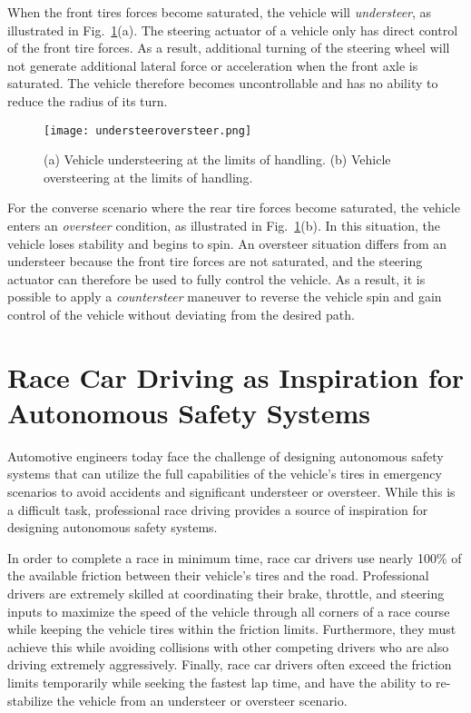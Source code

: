  When the front tires forces become saturated, the vehicle will \textit{understeer}, as illustrated in Fig.~\ref{fig:underover}(a).
 The steering actuator of a vehicle only has direct control of the front tire forces. As a result, 
 additional turning of the steering wheel will not generate additional lateral force or acceleration when the front axle is saturated.
The vehicle therefore becomes uncontrollable and has no ability to reduce the radius of its turn. 
  \begin{figure}[h]
\centering
\texttt{[image: understeeroversteer.png]}
\caption[Understeer and Oversteer]{(a) Vehicle understeering at the limits of handling. (b) Vehicle oversteering at the limits of handling.}
\label{fig:underover}
\end{figure}

For the converse scenario where the rear tire forces become saturated, the vehicle
 enters an \textit{oversteer} condition, as illustrated in Fig.~\ref{fig:underover}(b). In this situation, the vehicle loses stability and begins to
spin. An oversteer situation differs
 from an understeer because the front tire forces are not saturated, and the steering actuator can therefore be used to fully control the vehicle. As a result, it is possible
to apply a \textit{countersteer} maneuver to reverse the vehicle spin and gain control of the vehicle without deviating from the desired path.

\section{Race Car Driving as Inspiration for \newline Autonomous Safety Systems}

Automotive engineers today face the challenge of designing autonomous safety systems that can utilize 
the full capabilities of the vehicle's tires in emergency scenarios to avoid accidents and
significant understeer or oversteer. While this is a difficult task, professional race driving provides a source of inspiration for 
designing autonomous safety systems. 

In order to complete a race in minimum time, race car drivers use nearly 100\% of the 
available friction between their vehicle's tires and the road. Professional drivers are extremely skilled at coordinating
 their brake, throttle, and steering inputs to maximize the speed of the vehicle through all corners of a race course while keeping
the vehicle tires within the friction limits. Furthermore, they must achieve this while avoiding collisions with
 other competing drivers who are also driving extremely aggressively. Finally, race car drivers often exceed the friction limits temporarily
 while seeking the fastest lap time, and have the ability to re-stabilize the vehicle from an understeer or oversteer scenario. 
 
